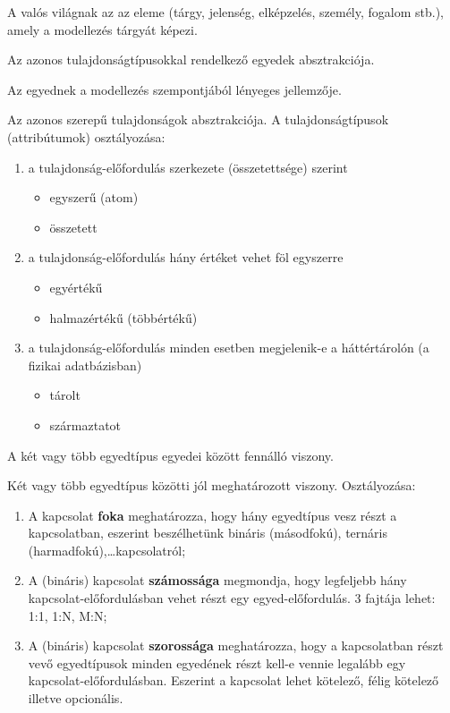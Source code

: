 \begin{description}[nosep]
	\item[Egyed] A valós világnak az az eleme (tárgy, jelenség, elképzelés, személy, fogalom stb.), amely a modellezés tárgyát képezi.
	\item[Egyedtípus] Az azonos tulajdonságtípusokkal rendelkező egyedek absztrakciója.
	\item[Tulajdonság] Az egyednek a modellezés szempontjából lényeges jellemzője.
	\item[Tulajdonságtípus] Az azonos szerepű tulajdonságok absztrakciója. A tulajdonságtípusok (attribútumok) osztályozása:
	\begin{enumerate}
		\item a tulajdonság-előfordulás szerkezete (összetettsége) szerint
		\begin{itemize}
			\item egyszerű (atom)
			\item összetett
		\end{itemize}
		\item a tulajdonság-előfordulás hány értéket vehet föl egyszerre
		\begin{itemize}
			\item egyértékű
			\item halmazértékű (többértékű)
		\end{itemize}
		\item a tulajdonság-előfordulás minden esetben megjelenik-e a háttértárolón (a fizikai adatbázisban)
		\begin{itemize}
			\item tárolt
			\item származtatot
		\end{itemize}
	\end{enumerate}
	\item[kapcsolat] A két vagy több egyedtípus egyedei között fennálló viszony.
	\item[Kapcsolattípus] Két vagy több egyedtípus közötti jól meghatározott viszony. Osztályozása:
	\begin{enumerate}
		\item A kapcsolat \textbf{foka} meghatározza, hogy hány egyedtípus vesz részt a kapcsolatban, eszerint beszélhetünk bináris (másodfokú), ternáris (harmadfokú),\dots kapcsolatról;
		\item A (bináris) kapcsolat \textbf{számossága} megmondja, hogy legfeljebb hány kapcsolat-előfordulásban vehet részt egy egyed-előfordulás. 3 fajtája lehet: 1:1, 1:N, M:N;
		\item A (bináris) kapcsolat \textbf{szorossága} meghatározza, hogy a kapcsolatban részt vevő egyedtípusok minden egyedének részt kell-e vennie legalább egy kapcsolat-előfordulásban. Eszerint a kapcsolat lehet kötelező, félig kötelező illetve opcionális.
	\end{enumerate}
\end{description}

